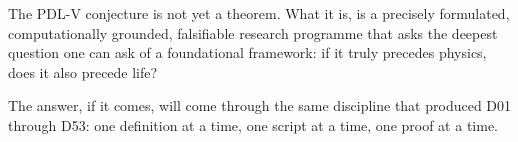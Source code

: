 \documentclass[12pt,a4paper]{article}
\theoremstyle{plain}
\theoremstyle{definition}
\theoremstyle{remark}
\newcommand{\PDL}{\textsc{PDL}}
\begin{document}
The \PDL-V conjecture is not yet a theorem. What it is, is a precisely formulated,
computationally grounded, falsifiable research programme that asks the deepest
question one can ask of a foundational framework: if it truly precedes physics, does
it also precede life?

The answer, if it comes, will come through the same discipline that produced D01
through D53: one definition at a time, one script at a time, one proof at a time.

\clearpage



\end{document}
